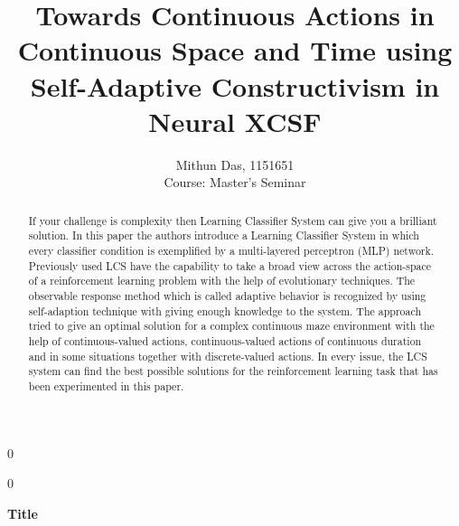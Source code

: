 \documentclass[12pt]{article}
\newcommand{\blind}{0}
\begin{document}
{\fontsize{2.5}{4}\selectfont}
%





\blind
{
  \title{\bf 
 Towards Continuous Actions in Continuous Space and Time using Self-Adaptive Constructivism in Neural XCSF
}
  \author{Mithun Das, 1151651{}\\
    Course: Master's Seminar\\
}
  \maketitle
} \fi

\blind
{
  \bigskip
  \bigskip
  \bigskip
  \begin{center}
    {\LARGE\bf Title}
\end{center}
  \medskip
} \fi

\bigskip
\begin{Note}
\end{Note}




\begin{abstract}
If your challenge is complexity then Learning Classifier System can give you a brilliant solution. In this paper the authors introduce a Learning Classifier System in which every classifier condition is exemplified by a multi-layered perceptron (MLP) network. Previously used LCS have the capability to take a broad view across the action-space of a reinforcement learning problem with the help of evolutionary techniques. The observable response method which is called adaptive behavior is recognized by using self-adaption technique with giving enough knowledge to the system. The approach tried to give an optimal solution for a complex continuous maze environment with the help of continuous-valued actions, continuous-valued actions of continuous duration and in some situations together with discrete-valued actions. In every issue, the LCS system can find the best possible solutions for the reinforcement learning task that has been experimented in this paper.  
\end{abstract}
\end{document}
